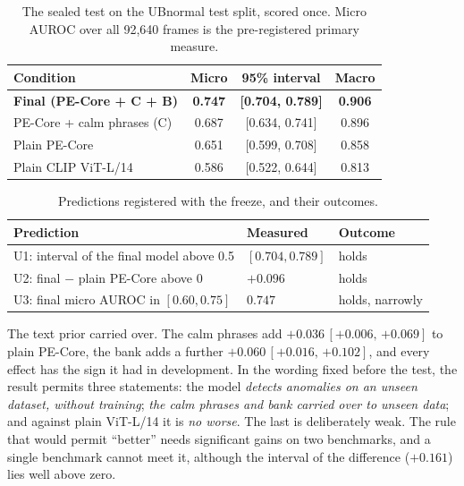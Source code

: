\documentclass[conference,a4paper]{IEEEtran}
\newcommand{\ci}[2]{\,[{#1},\,{#2}]}
\begin{document}
\begin{table}[!t]
\caption{The sealed test on the UBnormal test split, scored once. Micro AUROC
over all 92{,}640 frames is the pre-registered primary measure.}
\label{tbl:sealed}
\centering
\footnotesize
\setlength{\tabcolsep}{3pt}
\begin{tabularx}{\columnwidth}{@{}Z c c c@{}}
\toprule
\textbf{Condition} & \textbf{Micro} & \textbf{95\% interval} & \textbf{Macro} \\
\midrule
\textbf{Final (PE-Core + C + B)} & \textbf{0.747} & \textbf{[0.704, 0.789]} & \textbf{0.906} \\
PE-Core + calm phrases (C) & 0.687 & [0.634, 0.741] & 0.896 \\
Plain PE-Core & 0.651 & [0.599, 0.708] & 0.858 \\
Plain CLIP ViT-L/14 & 0.586 & [0.522, 0.644] & 0.813 \\
\bottomrule
\end{tabularx}
\end{table}

\begin{table}[!t]
\caption{Predictions registered with the freeze, and their outcomes.}
\label{tbl:pred}
\centering
\footnotesize
\begin{tabularx}{\columnwidth}{@{}Z l l@{}}
\toprule
\textbf{Prediction} & \textbf{Measured} & \textbf{Outcome} \\
\midrule
U1: interval of the final model above 0.5 & $[0.704, 0.789]$ & holds \\
U2: final $-$ plain PE-Core above 0 & $+0.096$ & holds \\
U3: final micro AUROC in $[0.60, 0.75]$ & $0.747$ & holds, narrowly \\
\bottomrule
\end{tabularx}
\end{table}

The text prior carried over. The calm phrases add $+0.036\ci{+0.006}{+0.069}$
to plain PE-Core, the bank adds a further $+0.060\ci{+0.016}{+0.102}$, and every
effect has the sign it had in development. In the wording fixed before the test,
the result permits three statements: the model \emph{detects anomalies on an
unseen dataset, without training}; \emph{the calm phrases and bank carried over
to unseen data}; and against plain ViT-L/14 it is \emph{no worse}. The last is
deliberately weak. The rule that would permit ``better'' needs significant gains
on two benchmarks, and a single benchmark cannot meet it, although the interval
of the difference ($+0.161$) lies well above zero.
\end{document}
